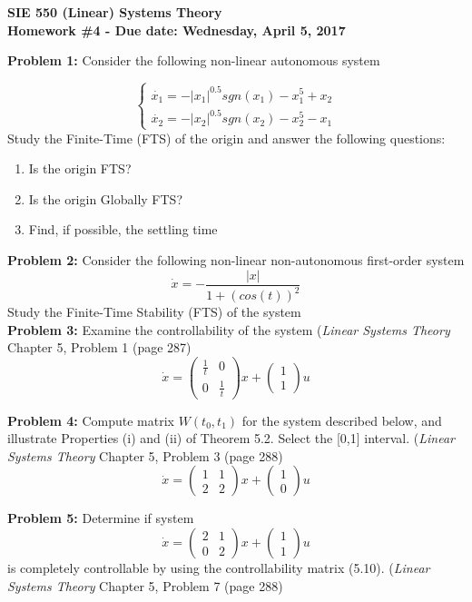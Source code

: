 \documentclass[12pt]{article}
\begin{document}
{\centering
 \textbf{SIE 550 (Linear) Systems Theory\\Homework \#4 - Due date: Wednesday, April 5, 2017 \newline}\par
 
} 

\noindent
\textbf{Problem 1:} Consider the following non-linear autonomous system

$$
\begin{cases} 
	\dot{x_1} = - |x_1|^{0.5} sgn(x_1)- x_1^5+x_2 \\
	\dot{x_2}=-|x_2|^{0.5} sgn(x_2)-x_2^5-x_1
\end{cases}
$$
Study the Finite-Time (FTS) of the origin and answer the following questions:
\begin{enumerate}
	\item Is the origin FTS?
	\item Is the origin Globally FTS?
	\item Find, if possible, the settling time
\end{enumerate}

\noindent
\textbf{Problem 2:} Consider the following non-linear non-autonomous first-order system
$$
\dot{x}=-\frac{|x|}{1+(cos(t))^2}
$$
Study the Finite-Time Stability (FTS) of the system \\

\noindent
\textbf{Problem 3:} Examine the controllability of the system ({\em Linear Systems Theory} Chapter 5, Problem 1 (page 287)
$$
\dot{x}=
\begin{pmatrix} 
	\frac{1}{t} & 0 \\
	0 & \frac{1}{t}
\end{pmatrix} x + 
\begin{pmatrix} 
1 \\
1
\end{pmatrix} u
$$

\noindent
\textbf{Problem 4:} Compute matrix $W(t_0,t_1)$ for the system described below, and illustrate Properties (i) and (ii) of Theorem 5.2. Select the [0,1] interval. ({\em Linear Systems Theory} Chapter 5, Problem 3 (page 288)
$$
\dot{x}=
\begin{pmatrix}
	1 & 1 \\
	2 & 2
\end{pmatrix}
x + 
\begin{pmatrix}
	1 \\
	0
\end{pmatrix} u
$$

\noindent
\textbf{Problem 5:} Determine if system
$$ \dot{x} = 
\begin{pmatrix}
	2 & 1 \\
	0 & 2
\end{pmatrix} x +
\begin{pmatrix} 
	1 \\
	1
\end{pmatrix} u
$$
is completely controllable by using the controllability matrix (5.10). ({\em Linear Systems Theory} Chapter 5, Problem 7 (page 288)\\
\end{document}
